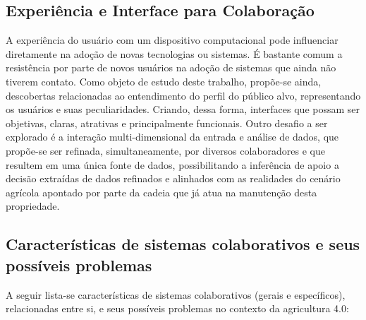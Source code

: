 \documentclass[12pt]{article}
\begin{document}
\subsection{Experiência e Interface para Colaboração}
\label{subsec:experiencia_interface_colaboracao}

A experiência do usuário com um dispositivo computacional pode influenciar diretamente na adoção de novas tecnologias ou sistemas. É bastante comum a resistência por parte de novos usuários na adoção de sistemas que ainda não tiverem contato. Como objeto de estudo deste trabalho, propõe-se ainda, descobertas relacionadas ao entendimento do perfil do público alvo, representando os usuários e suas peculiaridades. Criando, dessa forma, interfaces que possam ser objetivas, claras, atrativas e principalmente funcionais. Outro desafio a ser explorado é a interação multi-dimensional da entrada e análise de dados, que propõe-se ser refinada, simultaneamente, por diversos colaboradores e que resultem em uma única fonte de dados, possibilitando a inferência de apoio a decisão extraídas de dados refinados e alinhados com as realidades do cenário agrícola apontado por parte da cadeia que já atua na manutenção desta propriedade.

\subsection{Características de sistemas colaborativos e seus possíveis problemas}
\label{subsec:caracteristicas_problemas}

A seguir lista-se características de sistemas colaborativos (gerais e específicos), relacionadas entre si, e seus possíveis problemas no contexto da agricultura 4.0:
\end{document}
